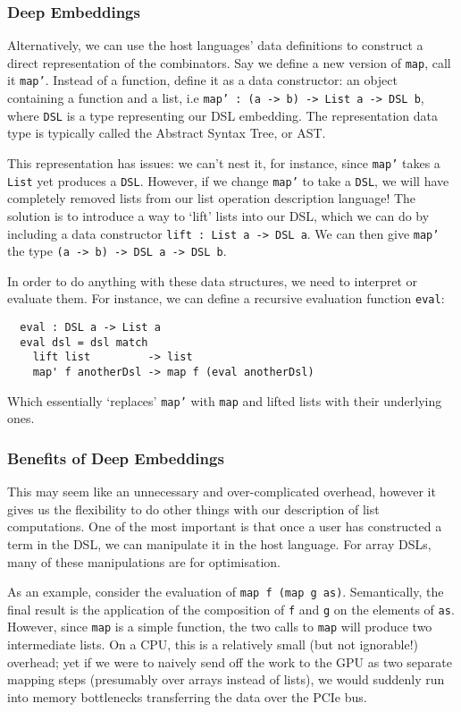 \documentclass[a4paper,12pt]{article}
\newcommand{\icf}[1]{\mbox{\texttt{#1}}} %
\begin{document}
\subsubsection*{Deep Embeddings} 
Alternatively, we can use the host languages' data definitions to construct a direct representation of the combinators. 
Say we define a new version of \icf{map}, call it \icf{map'}.
Instead of a function, define it as a data constructor: an object containing a function and a list, i.e \texttt{map'\ :\ (a\ ->\ b)\ ->\ List\ a\ ->\ DSL\ b}, where \icf{DSL} is a type representing our DSL embedding. 
The representation data type is typically called the Abstract Syntax Tree, or AST.

This representation has issues: we can't nest it, for instance, since \icf{map'} takes a \icf{List} yet produces a \icf{DSL}. 
However, if we change \icf{map'} to take a \icf{DSL}, we will have completely removed lists from our list operation description language! 
The solution is to introduce a way to `lift' lists into our DSL, which we can do by  including a data constructor \texttt{lift\ :\ List\ a\ ->\ DSL\ a}. 
We can then give \icf{map'} the type \icf{(a\ ->\ b)\ ->\ DSL\ a\ ->\ DSL\ b}.

In order to do anything with these data structures, we need to interpret or evaluate them. 
For instance, we can define a recursive evaluation function \icf{eval}:

\begin{verbatim}
  eval : DSL a -> List a
  eval dsl = dsl match
    lift list         -> list
    map' f anotherDsl -> map f (eval anotherDsl)
\end{verbatim}

Which essentially `replaces' \icf{map'} with \icf{map} and lifted lists with their underlying ones.

\subsubsection*{Benefits of Deep Embeddings}
This may seem like an unnecessary and over-complicated overhead, however it gives us the flexibility to do other things with our description of list computations. 
One of the most important is that once a user has constructed a term in the DSL, we can manipulate it in the host language. 
For array DSLs, many of these manipulations are for optimisation.

As an example, consider the evaluation of \icf{map\ f\ (map\ g\ as)}. 
Semantically, the final result is the application of the composition of \icf{f} and \icf{g} on the elements of \icf{as}. 
However, since \icf{map} is a simple function, the two calls to \icf{map} will produce two intermediate lists. 
On a CPU, this is a relatively small (but not ignorable!) overhead; yet if we were to naively send off the work to the GPU as two separate mapping steps (presumably over arrays instead of lists), we would suddenly run into memory bottlenecks transferring the data over the PCIe bus.
\end{document}
